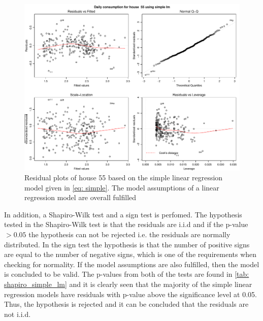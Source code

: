\begin{figure}
    \centering
    \includegraphics[width=1.\textwidth]{../../../figures/simple_lm55.pdf}
    \caption{Residual plots of house 55 based on the simple linear regression model given in \cref{eq: simple}. The model assumptions of a linear regression model are overall fulfilled}
    \label{fig: simple_lm_55}
\end{figure}
In addition, a Shapiro-Wilk test and a sign test is perfomed. The hypothesis tested in the Shapiro-Wilk test is that the residuals are i.i.d and if the p-value $> 0.05$ the hypothesis can not be rejected i.e. the residuals are normally distributed. In the sign test the hypothesis is that the number of positive signs are equal to the number of negative signs, which is one of the requirements when checking for normality. If the model assumptions are also fulfilled, then the model is concluded to be valid. The p-values from both of the tests are found in \cref{tab: shapiro_simple_lm} and it is clearly seen that the majority of the simple linear regression models have residuals with p-value above the significance level at 0.05. Thus, the hypothesis is rejected and it can be concluded that the residuals are not i.i.d.

